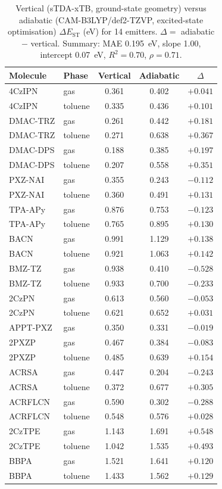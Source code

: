\documentclass[twoside,twocolumn,9pt]{extarticle}
\begin{document}
\begin{table}[htbp]
  \centering
  \caption{Vertical (sTDA-xTB, ground-state geometry) versus adiabatic
    (CAM-B3LYP/def2-TZVP, excited-state optimisation) $\Delta E_\text{ST}$ (eV) for
    \num{14} emitters. $\Delta = $ adiabatic $-$ vertical. Summary: MAE
    \qty{0.195}{\electronvolt}, slope \num{1.00}, intercept \qty{0.07}{\electronvolt},
    $R^2 = 0.70$, $\rho = 0.71$.}
  \label{tab:adiabatic}
  \footnotesize
  \begin{tabular}{llccc}
    \toprule
    Molecule & Phase & Vertical & Adiabatic & $\Delta$ \\
    \midrule
    4CzIPN & gas & 0.361 & 0.402 & $+0.041$ \\
    4CzIPN & toluene & 0.335 & 0.436 & $+0.101$ \\
    DMAC-TRZ & gas & 0.261 & 0.442 & $+0.181$ \\
    DMAC-TRZ & toluene & 0.271 & 0.638 & $+0.367$ \\
    DMAC-DPS & gas & 0.188 & 0.385 & $+0.197$ \\
    DMAC-DPS & toluene & 0.207 & 0.558 & $+0.351$ \\
    PXZ-NAI & gas & 0.355 & 0.243 & $-0.112$ \\
    PXZ-NAI & toluene & 0.360 & 0.491 & $+0.131$ \\
    TPA-APy & gas & 0.876 & 0.753 & $-0.123$ \\
    TPA-APy & toluene & 0.765 & 0.895 & $+0.130$ \\
    BACN & gas & 0.991 & 1.129 & $+0.138$ \\
    BACN & toluene & 0.921 & 1.063 & $+0.142$ \\
    BMZ-TZ & gas & 0.938 & 0.410 & $-0.528$ \\
    BMZ-TZ & toluene & 0.933 & 0.700 & $-0.233$ \\
    2CzPN & gas & 0.613 & 0.560 & $-0.053$ \\
    2CzPN & toluene & 0.621 & 0.652 & $+0.031$ \\
    APPT-PXZ & gas & 0.350 & 0.331 & $-0.019$ \\
    2PXZP & gas & 0.467 & 0.384 & $-0.083$ \\
    2PXZP & toluene & 0.485 & 0.639 & $+0.154$ \\
    ACRSA & gas & 0.447 & 0.204 & $-0.243$ \\
    ACRSA & toluene & 0.372 & 0.677 & $+0.305$ \\
    ACRFLCN & gas & 0.590 & 0.302 & $-0.288$ \\
    ACRFLCN & toluene & 0.548 & 0.576 & $+0.028$ \\
    2CzTPE & gas & 1.143 & 1.691 & $+0.548$ \\
    2CzTPE & toluene & 1.042 & 1.535 & $+0.493$ \\
    BBPA & gas & 1.521 & 1.641 & $+0.120$ \\
    BBPA & toluene & 1.433 & 1.562 & $+0.129$ \\
    \bottomrule
  \end{tabular}
\end{table}
\end{document}
